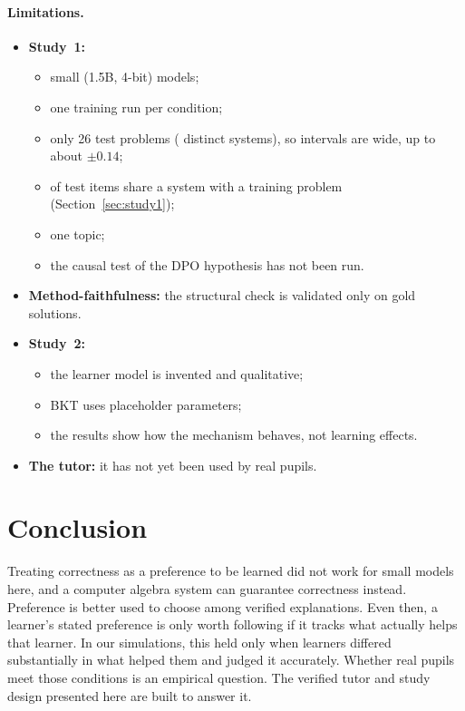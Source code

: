 \documentclass[11pt,a4paper]{article}
\begin{document}
\paragraph{Limitations.}
\begin{itemize}
  \item \textbf{Study~1:}
    \begin{itemize}
      \item small (1.5B, 4-bit) models;
      \item one training run per condition;
      \item only 26 test problems (\numDistinctTestSystems{} distinct systems), so
            intervals are wide, up to about $\pm 0.14$;
      \item \numLeakTestItems{} of \numTestItems{} test items share a system with a training
            problem (Section~\ref{sec:study1});
      \item one topic;
      \item the causal test of the DPO hypothesis has not been run.
    \end{itemize}
  \item \textbf{Method-faithfulness:} the structural check is validated only on gold
        solutions.
  \item \textbf{Study~2:}
    \begin{itemize}
      \item the learner model is invented and qualitative;
      \item BKT uses placeholder parameters;
      \item the results show how the mechanism behaves, not learning effects.
    \end{itemize}
  \item \textbf{The tutor:} it has not yet been used by real pupils.
\end{itemize}

\section{Conclusion}
Treating correctness as a preference to be learned did not work for small models here, and a
computer algebra system can guarantee correctness instead. Preference is better used to
choose among verified explanations. Even then, a learner's stated preference is only worth
following if it tracks what actually helps that learner. In our simulations, this held only
when learners differed substantially in what helped them and judged it accurately. Whether
real pupils meet those conditions is an empirical question. The verified tutor and study
design presented here are built to answer it.
\end{document}
